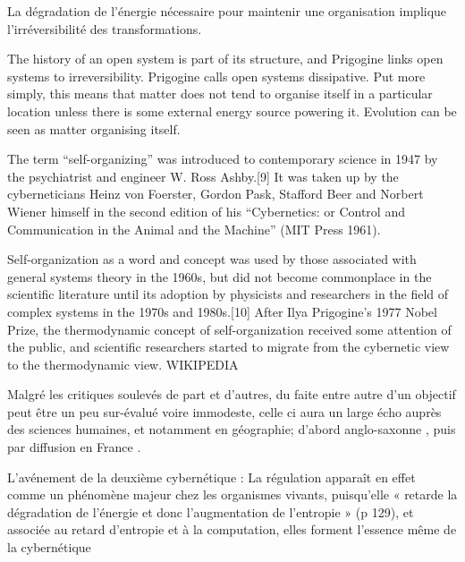 La dégradation de l'énergie nécessaire pour maintenir une organisation implique l'irréversibilité des transformations.


The history of an open system is part of its structure, and Prigogine links open systems to irreversibility. Prigogine calls open systems dissipative. Put more simply, this means that matter does not tend to organise itself in a particular location unless there is some external energy source powering it. Evolution can be seen as matter organising itself.


The term \enquote{self-organizing} was introduced to contemporary science in 1947 by the psychiatrist and engineer W. Ross Ashby.[9] It was taken up by the cyberneticians Heinz von Foerster, Gordon Pask, Stafford Beer and Norbert Wiener himself in the second edition of his \enquote{Cybernetics: or Control and Communication in the Animal and the Machine} (MIT Press 1961).

Self-organization as a word and concept was used by those associated with general systems theory in the 1960s, but did not become commonplace in the scientific literature until its adoption by physicists and researchers in the field of complex systems in the 1970s and 1980s.[10] After Ilya Prigogine's 1977 Nobel Prize, the thermodynamic concept of self-organization received some attention of the public, and scientific researchers started to migrate from the cybernetic view to the thermodynamic view. WIKIPEDIA


Malgré les critiques soulevés de part et d'autres, du faite entre autre d'un objectif peut être un peu sur-évalué voire immodeste, celle ci aura un large écho auprès des sciences humaines, et notamment en géographie; d'abord anglo-saxonne \autocite{Haggett1965, Chorley1962}, puis par diffusion en France \autocite{Raymond}.



L'avénement de la deuxième cybernétique :
La régulation apparaît en effet comme un phénomène majeur chez les organismes vivants, puisqu’elle « retarde la dégradation de l’énergie et donc l’augmentation de l’entropie » (p 129), et associée au retard d’entropie et à la computation, elles forment l’essence même de la cybernétique


\printbibliography[heading=subbibliography]

\stopcontents[chapters]
